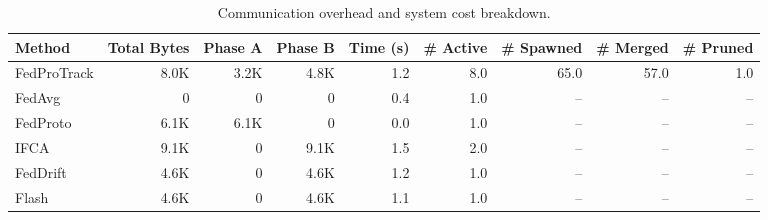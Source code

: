 \begin{table}[t]
\centering
\caption{Communication overhead and system cost breakdown.}
\label{tab:overhead}
\begin{tabular}{lrrrrrrrr}
\toprule
Method & Total Bytes & Phase A & Phase B & Time (s) & \# Active & \# Spawned & \# Merged & \# Pruned \\
\midrule
FedProTrack & 8.0K & 3.2K & 4.8K & 1.2 & 8.0 & 65.0 & 57.0 & 1.0 \\
FedAvg & 0 & 0 & 0 & 0.4 & 1.0 & -- & -- & -- \\
FedProto & 6.1K & 6.1K & 0 & 0.0 & 1.0 & -- & -- & -- \\
IFCA & 9.1K & 0 & 9.1K & 1.5 & 2.0 & -- & -- & -- \\
FedDrift & 4.6K & 0 & 4.6K & 1.2 & 1.0 & -- & -- & -- \\
Flash & 4.6K & 0 & 4.6K & 1.1 & 1.0 & -- & -- & -- \\
\bottomrule
\end{tabular}
\end{table}